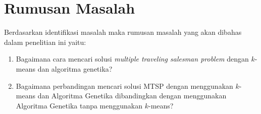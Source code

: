 \section{Rumusan Masalah}

Berdasarkan identifikasi masalah maka rumusan masalah yang akan dibahas dalam penelitian ini yaitu:
\begin{enumerate}
    \item Bagaimana cara mencari solusi \textit{multiple traveling salesman problem} dengan $k$-means dan algoritma genetika?
    \item Bagaimana perbandingan mencari solusi MTSP dengan menggunakan $k$-means dan Algoritma Genetika dibandingkan dengan menggunakan Algoritma Genetika tanpa menggunakan $k$-means?
\end{enumerate}